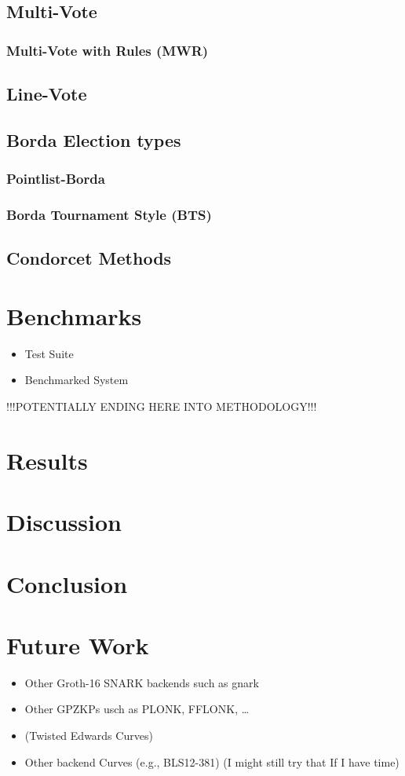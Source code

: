 \documentclass{article}
\begin{document}
\subsection{Multi-Vote}
\subsubsection{Multi-Vote with Rules (MWR)}
\subsection{Line-Vote}
\subsection{Borda Election types}
\subsubsection{Pointlist-Borda}
\subsubsection{Borda Tournament Style (BTS)}
\subsection{Condorcet Methods}

\section{Benchmarks}
\begin{itemize}
    \item Test Suite
    \item Benchmarked System
\end{itemize}
!!!POTENTIALLY ENDING HERE INTO METHODOLOGY!!!

\section{Results}

\section{Discussion}

\section{Conclusion}

\section{Future Work}
\begin{itemize}
    \item Other Groth-16 SNARK backends such as gnark
    \item Other GPZKPs usch as PLONK, FFLONK, \dots
    \item (Twisted Edwards Curves)
    \item Other backend Curves (e.g., BLS12-381) (I might still try that If I have time)
\end{itemize}
\end{document}
